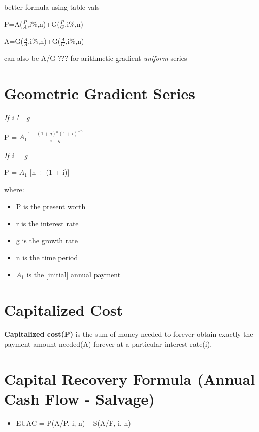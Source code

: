 \documentclass[]{article}
\providecommand{\tightlist}{%
  \setlength{\itemsep}{0pt}\setlength{\parskip}{0pt}}
\begin{document}
better formula using table vals

P=A(\(\frac{P}{A}\),i\%,n)+G(\(\frac{P}{G}\),i\%,n)

A=G(\(\frac{A}{A}\),i\%,n)+G(\(\frac{A}{G}\),i\%,n)

can also be A/G ??? for arithmetic gradient \emph{uniform} series

\hypertarget{geometric-gradient-series}{%
\section{Geometric Gradient Series}\label{geometric-gradient-series}}

\emph{If i != g}

P = \(A_{1}\frac{1-(1+g)^{n}(1+i)^{-n}}{i-g}\)

\emph{If i = g}

P = \(A_{1}\) {[}n ÷ (1 + i){]}

where:

\begin{itemize}
\tightlist
\item
  P is the present worth
\item
  r is the interest rate
\item
  g is the growth rate
\item
  n is the time period
\item
  \(A_{1}\) is the {[}initial{]} annual payment
\end{itemize}

\hypertarget{capitalized-cost}{%
\section{Capitalized Cost}\label{capitalized-cost}}

\textbf{Capitalized cost(P)} is the sum of money needed to forever
obtain exactly the payment amount needed(A) forever at a particular
interest rate(i).

\hypertarget{capital-recovery-formula-annual-cash-flow---salvage}{%
\section{Capital Recovery Formula (Annual Cash Flow -
Salvage)}\label{capital-recovery-formula-annual-cash-flow---salvage}}

\begin{itemize}
\tightlist
\item
  EUAC = P(A/P, i, n) -- S(A/F, i, n)
\end{itemize}
\end{document}
